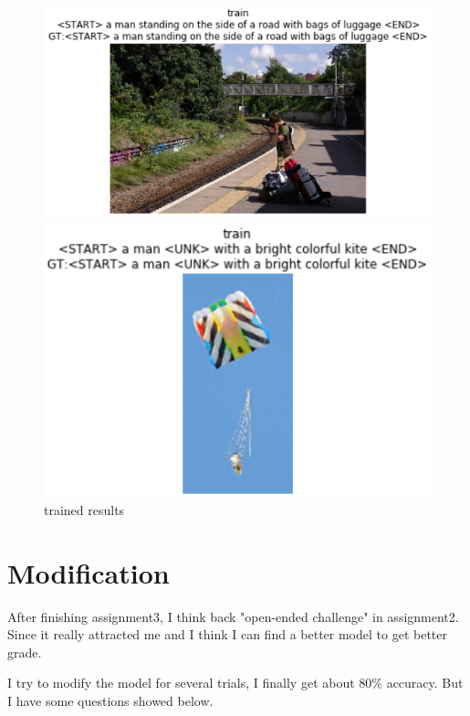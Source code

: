 \documentclass{article}
\begin{document}
\begin{figure}[htbp]
	\centering
	\begin{minipage}[t]{0.5\textwidth}
		\centering
		\includegraphics[width=1.0\textwidth]{7.png}
	\end{minipage}
	\begin{minipage}[t]{0.4\textwidth}
		\centering
		\includegraphics[width=1.0\textwidth]{8.png}
	\end{minipage}
	\caption{trained results} 
\end{figure}

\section{Modification}
After finishing assignment3, I think back "open-ended challenge" in assignment2. Since it really attracted me and I think I can find a better model to get better grade.

I try to modify the model for several trials, I finally get about 80\% accuracy. But I have some questions showed below.
\end{document}
